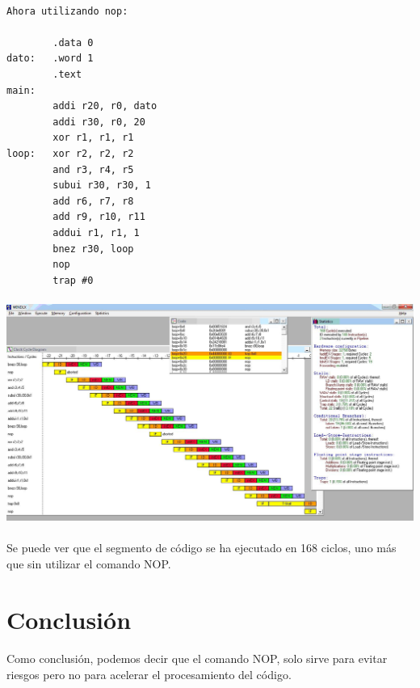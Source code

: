 \documentclass[a4paper,11pt]{article}
\begin{document}
\begin{enumerate}
\paragraph{}
\begin{center}
\begin{verbatim}
Ahora utilizando nop:

		.data 0
dato: 	.word 1
		.text
main:
		addi r20, r0, dato
		addi r30, r0, 20
		xor r1, r1, r1
loop: 	xor r2, r2, r2
		and r3, r4, r5
		subui r30, r30, 1
		add r6, r7, r8
		add r9, r10, r11
		addui r1, r1, 1
		bnez r30, loop
		nop
		trap #0
\end{verbatim}
\end{center}

\paragraph{}
\centering
\includegraphics[width=400pt]{punto5-4.JPG}

\paragraph{}
Se puede ver que el segmento de c\'odigo se ha ejecutado en 168 ciclos, uno m\'as que sin utilizar el comando NOP.



\end{enumerate}

\newpage 

\section{Conclusi\'on}
\paragraph{}
Como conclusi\'on, podemos decir que el comando NOP, solo sirve para evitar riesgos pero no para acelerar el procesamiento del c\'odigo.
\end{document}
